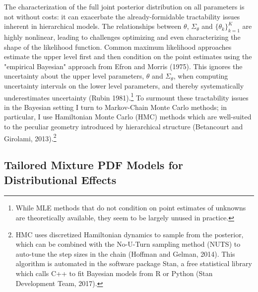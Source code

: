 \documentclass[AER]{AEA}
\begin{document}
The characterization of the full joint posterior distribution on all parameters is not without costs: it can exacerbate the already-formidable tractability issues inherent in hierarchical models. The relationships between $\theta$, $\Sigma_{\theta}$ and $\{\theta_k \}_{k=1}^K$ are highly nonlinear, leading to challenges optimizing and even characterizing the shape of the likelihood function. Common maximum likelihood approaches estimate the upper level first and then condition on the point estimates using the "empirical Bayesian" approach from Efron and Morris (1975). This ignores the uncertainty about the upper level parameters, $\theta$ and $\Sigma_{\theta}$, when computing uncertainty intervals on the lower level parameters, and thereby systematically underestimates uncertainty (Rubin 1981).\footnote{While MLE methods that do not condition on point estimates of unknowns are theoretically available, they seem to be largely unused in practice.} To surmount these tractability issues in the Bayesian setting I turn to Markov-Chain Monte Carlo methods; in particular, I use Hamiltonian Monte Carlo (HMC) methods which are well-suited to the peculiar geometry introduced by hierarchical structure (Betancourt and Girolami, 2013).\footnote{HMC uses discretized Hamiltonian dynamics to sample from the posterior, which can be combined with the No-U-Turn sampling method (NUTS) to auto-tune the step sizes in the chain (Hoffman and Gelman, 2014). This algorithm is automated in the software package Stan, a free statistical library which calls C++ to fit Bayesian models from R or Python (Stan Development Team, 2017).}

\subsection{Tailored Mixture PDF Models for Distributional Effects}
\end{document}
